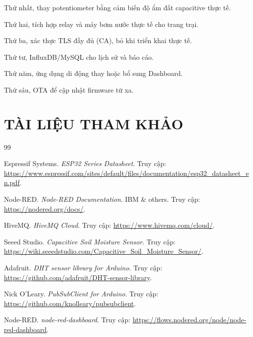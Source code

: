 \documentclass[12pt, a4paper]{article}
\newcommand{\code}[1]{\texttt{\detokenize{#1}}}
\begin{document}
Thứ nhất, thay potentiometer bằng cảm biến độ ẩm đất capacitive thực tế.

Thứ hai, tích hợp relay và máy bơm nước thực tế cho trang trại.

Thứ ba, xác thực TLS đầy đủ (CA), bỏ \code{setInsecure()} khi triển khai thực tế.

Thứ tư, InfluxDB/MySQL cho lịch sử và báo cáo.

Thứ năm, ứng dụng di động thay hoặc bổ sung Dashboard.

Thứ sáu, OTA để cập nhật firmware từ xa.

\newpage
{}
\section*{TÀI LIỆU THAM KHẢO}
{}
\label{sec:tailieu}

\begin{thebibliography}{99}
  \fontsize{13}{17}\selectfont

   Espressif Systems. \textit{ESP32 Series Datasheet}. Truy cập: \url{https://www.espressif.com/sites/default/files/documentation/esp32_datasheet_en.pdf}.

   Node-RED. \textit{Node-RED Documentation}. IBM \& others. Truy cập: \url{https://nodered.org/docs/}.

   HiveMQ. \textit{HiveMQ Cloud}. Truy cập: \url{https://www.hivemq.com/cloud/}.

   Seeed Studio. \textit{Capacitive Soil Moisture Sensor}. Truy cập: \url{https://wiki.seeedstudio.com/Capacitive_Soil_Moisture_Sensor/}.

   Adafruit. \textit{DHT sensor library for Arduino}. Truy cập: \url{https://github.com/adafruit/DHT-sensor-library}.

   Nick O'Leary. \textit{PubSubClient for Arduino}. Truy cập: \url{https://github.com/knolleary/pubsubclient}.

   Node-RED. \textit{node-red-dashboard}. Truy cập: \url{https://flows.nodered.org/node/node-red-dashboard}.

\end{thebibliography}
\end{document}
